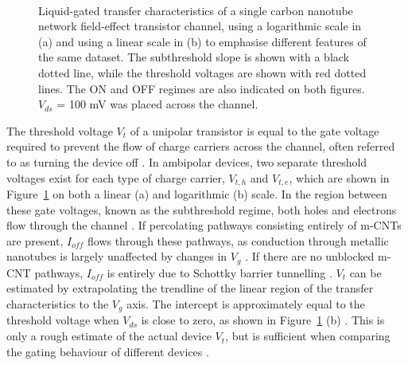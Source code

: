 \documentclass[
  a4paper,
]{scrbook}
\begin{document}
\begin{figure}
\begin{minipage}[t]{0.45\linewidth}
{{}

}

\end{minipage}%
%
\begin{minipage}[t]{0.01\linewidth}

{\centering 

~

}

\end{minipage}%

\caption[Liquid-gated transfer characteristics of a CNT FET channel
showing the region of hole conduction and the subthreshold
regime.]{\label{fig-CNT-characteristics}Liquid-gated transfer
characteristics of a single carbon nanotube network field-effect
transistor channel, using a logarithmic scale in (a) and using a linear
scale in (b) to emphasise different features of the same dataset. The
subthreshold slope is shown with a black dotted line, while the
threshold voltages are shown with red dotted lines. The ON and OFF
regimes are also indicated on both figures. \(V_{ds}\) = 100 mV was
placed across the channel.}

\end{figure}

The threshold voltage \(V_t\) of a unipolar transistor is equal to the
gate voltage required to prevent the flow of charge carriers across the
channel, often referred to as turning the device off
\autocite{Petti2016,Shkodra2021}. In ambipolar devices, two separate
threshold voltages exist for each type of charge carrier, \(V_{t,h}\)
and \(V_{t,e}\), which are shown in Figure~\ref{fig-CNT-characteristics}
on both a linear (a) and logarithmic (b) scale. In the region between
these gate voltages, known as the subthreshold regime, both holes and
electrons flow through the channel
\autocite{Avouris2007,Reiner-Rozman2015}. If percolating pathways
consisting entirely of m-CNTs are present, \(I_{off}\) flows through
these pathways, as conduction through metallic nanotubes is largely
unaffected by changes in \(V_g\) \autocite{Fuhrer2000,Topinka2009}. If
there are no unblocked m-CNT pathways, \(I_{off}\) is entirely due to
Schottky barrier tunnelling \autocite{Avouris2007}. \(V_t\) can be
estimated by extrapolating the trendline of the linear region of the
transfer characteristics to the \(V_g\) axis. The intercept is
approximately equal to the threshold voltage when \(V_{ds}\) is close to
zero, as shown in Figure~\ref{fig-CNT-characteristics} (b)
\autocite{Sze2006,Petti2016,Li2023}. This is only a rough estimate of
the actual device \(V_t\), but is sufficient when comparing the gating
behaviour of different devices \autocite{Li2023}.
\end{document}
